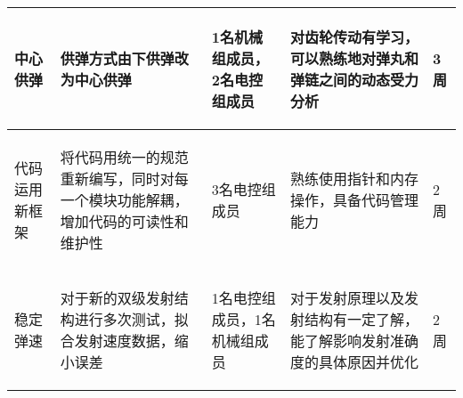 \begin{longtable}{ p{2cm} | p{3cm} | p{3cm} | p{4.8cm} | p{2cm} |}
    \hline
    
        \begin{center}
            中心供弹
        \end{center} &
        \begin{center}
            供弹方式由下供弹改为中心供弹
        \end{center} &
        \begin{center}
            1名机械组成员，2名电控组成员
        \end{center} &
        \begin{center}
            对齿轮传动有学习，可以熟练地对弹丸和弹链之间的动态受力分析
        \end{center} &
        \begin{center}
            3周
        \end{center}\\

    \hline
    
        \begin{center}
            代码运用新框架
        \end{center} &
        \begin{center}
            将代码用统一的规范重新编写，同时对每一个模块功能解耦，增加代码的可读性和维护性
        \end{center} &
        \begin{center}
            3名电控组成员
        \end{center} &
        \begin{center}
            熟练使用指针和内存操作，具备代码管理能力
        \end{center} &
        \begin{center}
            2周
        \end{center} \\

    \hline

        \begin{center}
            稳定弹速
        \end{center} &
        \begin{center}
            对于新的双级发射结构进行多次测试，拟合发射速度数据，缩小误差
        \end{center} &
        \begin{center}
            1名电控组成员，1名机械组成员
        \end{center} &
        \begin{center}
            对于发射原理以及发射结构有一定了解，能了解影响发射准确度的具体原因并优化
        \end{center} &
        \begin{center}
            2周
        \end{center} \\
        

\end{longtable}
